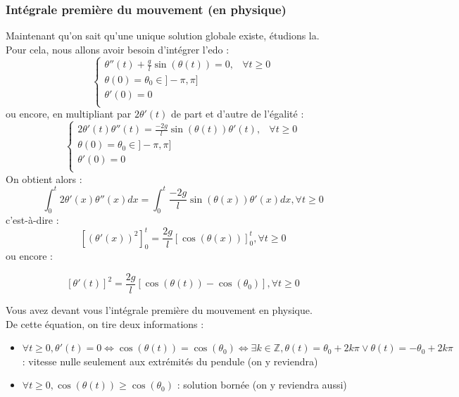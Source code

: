 \documentclass[9pt,a4paper]{article}
\begin{document}
\subsubsection{Intégrale première du mouvement (en physique)}
Maintenant qu'on sait qu'une unique solution globale existe, étudions la.\\
Pour cela, nous allons avoir besoin d'intégrer l'\gls{edo} :
$$
\left\{
  \begin{array}{lcl}
    \theta''(t) + \frac{g}{l}\sin(\theta(t)) = 0, & \forall t \geq 0 \\
    \theta(0) = \theta_0 \in ]-\pi, \pi] \\
    \theta'(0) = 0 \\
  \end{array}
\right.
$$
ou encore, en multipliant par $2\theta'(t)$ de part et d'autre de l'égalité :
$$
\left\{
  \begin{array}{lcl}
    2\theta'(t)\theta''(t) = \frac{-2g}{l}\sin(\theta(t))\theta'(t), & \forall t \geq 0 \\
    \theta(0) = \theta_0 \in ]-\pi, \pi] \\
    \theta'(0) = 0 \\
  \end{array}
\right.
$$
On obtient alors :
$$
\int_0^t2\theta'(x)\theta''(x)dx = \int_0^t\frac{-2g}{l}\sin(\theta(x))\theta'(x)dx, \forall t \geq 0
$$
c'est-à-dire :
$$
[(\theta'(x))^2]_0^t = \frac{2g}{l}[\cos(\theta(x))]_0^t, \forall t \geq 0
$$
ou encore :
\begin{tcolorbox}[colback=green!5!white, colframe=green!50!black]
    $$
    [\theta'(t)]^2 = \frac{2g}{l}[\cos(\theta(t)) - \cos(\theta_0)], \forall t \geq 0
    $$
\end{tcolorbox}
Vous avez devant vous l'intégrale première du mouvement en physique.\\
De cette équation, on tire deux informations :
\begin{itemize}[label=\textbullet]
    \item $\forall t \geq 0, \theta'(t) = 0 \Leftrightarrow \cos(\theta(t)) = \cos(\theta_0) \Leftrightarrow \exists k \in \mathbb{Z}, \theta(t) = \theta_0 + 2k\pi \lor \theta(t) = -\theta_0 + 2k\pi$ : vitesse nulle seulement aux extrémités du pendule (on y reviendra)
    \item $\forall t \geq 0, \cos(\theta(t)) \geq \cos(\theta_0)$ : solution bornée (on y reviendra aussi)
\end{itemize}
\end{document}
